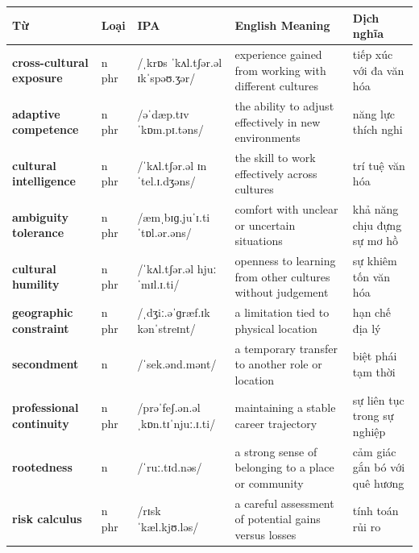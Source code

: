 \separator


\vspace{0.8em}
\begin{center}
\renewcommand{\arraystretch}{1.65}
\begin{tabularx}{\textwidth}{|V{0.22\textwidth}|C{0.07\textwidth}|I{0.20\textwidth}|Y|V{0.18\textwidth}|}
\hline
{}
\textbf{Từ} & \textbf{Loại} & \textbf{IPA} & \textbf{English Meaning} & \textbf{Dịch nghĩa} \\
\hline
\textbf{cross-cultural exposure} & n phr & /ˌkrɒs ˈkʌl.tʃər.əl ɪkˈspəʊ.ʒər/ & experience gained from working with different cultures & tiếp xúc với đa văn hóa \\ \hline
\textbf{adaptive competence} & n phr & /əˈdæp.tɪv ˈkɒm.pɪ.təns/ & the ability to adjust effectively in new environments & năng lực thích nghi \\ \hline
\textbf{cultural intelligence} & n phr & /ˈkʌl.tʃər.əl ɪnˈtel.ɪ.dʒəns/ & the skill to work effectively across cultures & trí tuệ văn hóa \\ \hline
\textbf{ambiguity tolerance} & n phr & /æmˌbɪɡ.juˈɪ.ti ˈtɒl.ər.əns/ & comfort with unclear or uncertain situations & khả năng chịu đựng sự mơ hồ \\ \hline
\textbf{cultural humility} & n phr & /ˈkʌl.tʃər.əl hjuːˈmɪl.ɪ.ti/ & openness to learning from other cultures without judgement & sự khiêm tốn văn hóa \\ \hline
\textbf{geographic constraint} & n phr & /ˌdʒiː.əˈɡræf.ɪk kənˈstreɪnt/ & a limitation tied to physical location & hạn chế địa lý \\ \hline
\textbf{secondment} & n & /ˈsek.ənd.mənt/ & a temporary transfer to another role or location & biệt phái tạm thời \\ \hline
\textbf{professional continuity} & n phr & /prəˈfeʃ.ən.əl ˌkɒn.tɪˈnjuː.ɪ.ti/ & maintaining a stable career trajectory & sự liên tục trong sự nghiệp \\ \hline
\textbf{rootedness} & n & /ˈruː.tɪd.nəs/ & a strong sense of belonging to a place or community & cảm giác gắn bó với quê hương \\ \hline
\textbf{risk calculus} & n phr & /rɪsk ˈkæl.kjʊ.ləs/ & a careful assessment of potential gains versus losses & tính toán rủi ro \\ \hline
\end{tabularx}
\end{center}

\newpage

